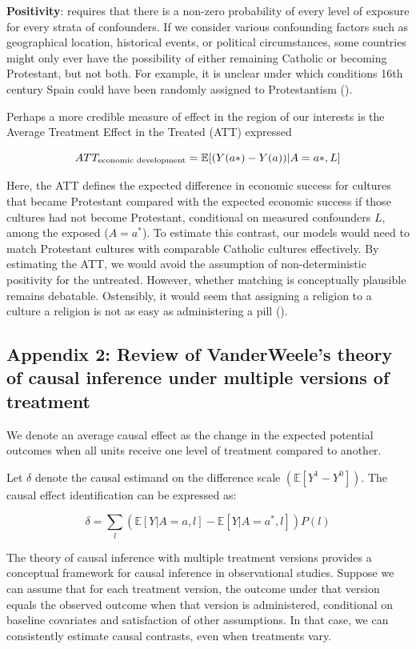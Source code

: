 \documentclass[
  singlecolumn,
  9pt]{article}
\begin{document}
\textbf{Positivity}: requires that there is a non-zero probability of
every level of exposure for every strata of confounders. If we consider
various confounding factors such as geographical location, historical
events, or political circumstances, some countries might only ever have
the possibility of either remaining Catholic or becoming Protestant, but
not both. For example, it is unclear under which conditions 16th century
Spain could have been randomly assigned to Protestantism
().

Perhaps a more credible measure of effect in the region of our interests
is the Average Treatment Effect in the Treated (ATT) expressed

\[ATT_{\textnormal{economic~development}} = \mathbb{E}[(Y(a*)- Y(a))|A = a*,L]\]

Here, the ATT defines the expected difference in economic success for
cultures that became Protestant compared with the expected economic
success if those cultures had not become Protestant, conditional on
measured confounders \(L\), among the exposed (\(A = a^*\)). To estimate
this contrast, our models would need to match Protestant cultures with
comparable Catholic cultures effectively. By estimating the ATT, we
would avoid the assumption of non-deterministic positivity for the
untreated. However, whether matching is conceptually plausible remains
debatable. Ostensibly, it would seem that assigning a religion to a
culture a religion is not as easy as administering a pill
().

\subsection{Appendix 2: Review of VanderWeele's theory of causal
inference under multiple versions of
treatment}\label{appendix-2-review-of-vanderweeles-theory-of-causal-inference-under-multiple-versions-of-treatment}

We denote an average causal effect as the change in the expected
potential outcomes when all units receive one level of treatment
compared to another.

Let \(\delta\) denote the causal estimand on the difference scale
\((\mathbb{E}[Y^1 - Y^0])\). The causal effect identification can be
expressed as:

\[ \delta = \sum_l \left( \mathbb{E}[Y|A=a,l] - \mathbb{E}[Y|A=a^*,l] \right) P(l)\]

The theory of causal inference with multiple treatment versions provides
a conceptual framework for causal inference in observational studies.
Suppose we can assume that for each treatment version, the outcome under
that version equals the observed outcome when that version is
administered, conditional on baseline covariates and satisfaction of
other assumptions. In that case, we can consistently estimate causal
contrasts, even when treatments vary.
\end{document}
